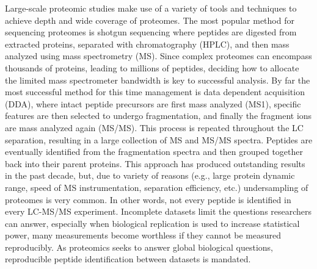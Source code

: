 Large-scale proteomic studies make use of a variety of tools and techniques to achieve depth and wide coverage of proteomes. The most popular method for sequencing proteomes is shotgun sequencing where peptides are digested from extracted proteins, separated with chromatography (HPLC), and then mass analyzed using mass spectrometry (MS).\cite{mudpit,mudpit2} Since complex proteomes can encompass thousands of proteins, leading to millions of peptides, deciding how to allocate the limited mass spectrometer bandwidth is key to successful analysis.\cite{100000} By far the most successful method for this time management is data dependent acquisition (DDA), where intact peptide precursors are first mass analyzed (MS1), specific \mz{} features are then selected to undergo fragmentation, and finally the fragment ions are mass analyzed again (MS/MS). This process is repeated throughout the LC separation, resulting in a large collection of MS and MS/MS spectra. Peptides are eventually identified from the fragmentation spectra and then grouped together back into their parent proteins.\cite{sequest,sadygov,venable,panda} This approach has produced outstanding results in the past decade, but, due to variety of reasons (e.g., large protein dynamic range, speed of MS instrumentation, separation efficiency, etc.) undersampling of proteomes is very common. In other words, not every peptide is identified in every LC-MS/MS experiment. Incomplete datasets limit the questions researchers can answer, especially when biological replication is used to increase statistical power, many measurements become worthless if they cannot be measured reproducibly.\cite{quant} As proteomics seeks to answer global biological questions, reproducible peptide identification between datasets is mandated.\cite{ideker,msbp,molloy}

